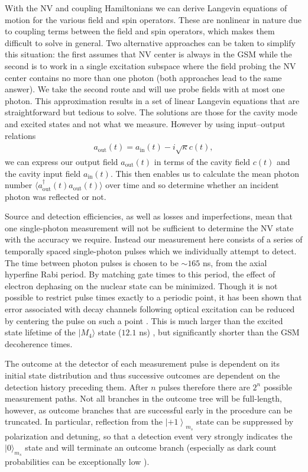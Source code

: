 \documentclass[aps,pra,amsmath,amssymb,reprint,superscriptaddress,tightenlines]{revtex4-1}
\begin{document}
With the NV and coupling Hamiltonians we can derive Langevin equations of motion for the various field and spin operators. These are nonlinear in nature due to coupling terms between the field and spin operators, which makes them difficult to solve in general. Two alternative approaches can be taken to simplify this situation: the first assumes that NV center is always in the GSM while the second is to work in a single excitation subspace \cite{Rephaeli12} where the field probing the NV center contains no more than one photon (both approaches lead to the same answer). We take the second route and will use probe fields with at most one photon. This approximation results in a set of linear Langevin equations that are straightforward but tedious to solve. The solutions are those for the cavity mode and excited states and not what we measure. However by using input--output relations \cite{Gardiner85}
\begin{align}
	a_{\text{out}}(t) = a_{\text{in}}(t) - i \sqrt{\kappa} c(t),
\end{align}
we can express our output field $a_{\text{out}}(t)$ in terms of the cavity field $c(t)$ and the cavity input field $a_{\text{in}}(t)$. This then enables us to calculate the mean photon number $\langle a^\dagger _{\text{out}}(t) a_{\text{out}}(t) \rangle$ over time and so determine whether an incident photon was reflected or not.

Source and detection efficiencies, as well as losses and imperfections, mean that one single-photon measurement will not be sufficient to determine the NV state with the accuracy we require. Instead our measurement here consists of a series of temporally spaced single-photon pulses which we individually attempt to detect. The time between photon pulses is chosen to be $\sim165$ ns, from the axial hyperfine Rabi period. By matching gate times to this period, the effect of electron dephasing on the nuclear state can be minimized. Though it is not possible to restrict pulse times exactly to a periodic point, it has been shown that error associated with decay channels following optical excitation can be reduced by centering the pulse on such a point \cite{Reiserer16}.  This is much larger than the excited state lifetime of the $|M_{4}\rangle$ state ($12.1$ ns) \cite{Goldman15}, but significantly shorter than the GSM decoherence times.

The outcome at the detector of each measurement pulse is dependent on its initial state distribution and thus successive outcomes are dependent on the detection history preceding them. After $n$ pulses therefore there are $2^{n}$ possible measurement paths. Not all branches in the outcome tree will be full-length, however, as outcome branches that are successful early in the procedure can be truncated. In particular, reflection from the $\left| +1 \right>_{m_{s}}$ state can be suppressed by polarization and detuning, so that a detection event very strongly indicates the $|0\rangle_{m_{s}}$ state and will terminate an outcome branch (especially as dark count probabilities can be exceptionally low \cite{FirstSensor16,ExcelitasTechnologies16,LaserComponents16}).
\end{document}

